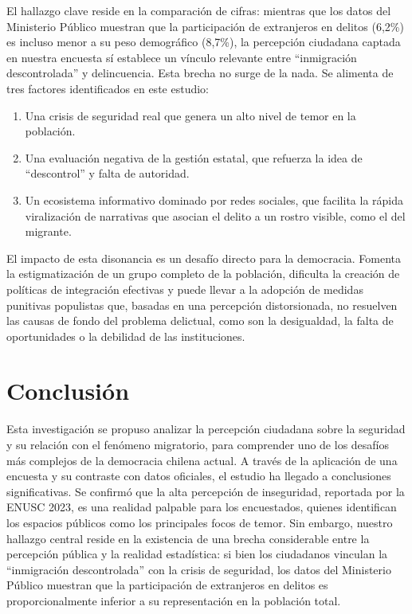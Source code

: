 \documentclass[12pt, a4paper]{article}
\begin{document}
El hallazgo clave reside en la comparación de cifras: mientras que los datos del Ministerio Público muestran que la participación de extranjeros en delitos (6,2\%) es incluso menor a su peso demográfico (8,7\%), la percepción ciudadana captada en nuestra encuesta sí establece un vínculo relevante entre ``inmigración descontrolada'' y delincuencia. Esta brecha no surge de la nada. Se alimenta de tres factores identificados en este estudio:
\begin{enumerate}
	\item Una crisis de seguridad real que genera un alto nivel de temor en la población.
	\item Una evaluación negativa de la gestión estatal, que refuerza la idea de ``descontrol'' y falta de autoridad.
	\item Un ecosistema informativo dominado por redes sociales, que facilita la rápida viralización de narrativas que asocian el delito a un rostro visible, como el del migrante.
\end{enumerate}

El impacto de esta disonancia es un desafío directo para la democracia. Fomenta la estigmatización de un grupo completo de la población, dificulta la creación de políticas de integración efectivas y puede llevar a la adopción de medidas punitivas populistas que, basadas en una percepción distorsionada, no resuelven las causas de fondo del problema delictual, como son la desigualdad, la falta de oportunidades o la debilidad de las instituciones.
\newpage

\section*{Conclusión}

Esta investigación se propuso analizar la percepción ciudadana sobre la seguridad y su relación con el fenómeno migratorio, para comprender uno de los desafíos más complejos de la democracia chilena actual. A través de la aplicación de una encuesta y su contraste con datos oficiales, el estudio ha llegado a conclusiones significativas. Se confirmó que la alta percepción de inseguridad, reportada por la ENUSC 2023, es una realidad palpable para los encuestados, quienes identifican los espacios públicos como los principales focos de temor. Sin embargo, nuestro hallazgo central reside en la existencia de una brecha considerable entre la percepción pública y la realidad estadística: si bien los ciudadanos vinculan la ``inmigración descontrolada'' con la crisis de seguridad, los datos del Ministerio Público muestran que la participación de extranjeros en delitos es proporcionalmente inferior a su representación en la población total.
\end{document}
